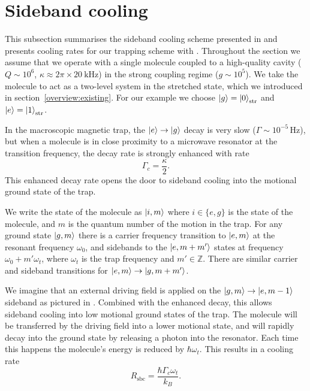 \section{Sideband cooling}

This subsection summarises the sideband cooling scheme presented in
 and presents cooling rates for our trapping scheme with
\CaF{}.  Throughout the section we assume that we operate with a single
molecule coupled to a high-quality cavity ($Q\sim10^6$, $\kappa \approx
2\pi\times \SI{20}{\kilo\hertz}$) in the strong coupling regime ($g\sim10^5$).
We take the molecule to act as a two-level system in the stretched state, which
we introduced in section~\ref{overview:existing}.  For our example we choose
$\ket{g}=\ket{0}_\text{str}$ and $\ket{e}=\ket{1}_\text{str}$.

In the macroscopic magnetic trap, the
$\ket{e}\rightarrow\ket{g}$ decay is very slow ($\Gamma \sim
10^{-5}\,\si{\hertz}$), but when a molecule is in close proximity to a microwave
resonator at the transition frequency, the decay rate is strongly enhanced
with rate
%
\begin{equation}
  \Gamma_c = \frac{\kappa}{2}.
\end{equation}
%
This enhanced decay rate opens the door to sideband cooling into the motional
ground state of the trap.

We write the state of the molecule as $\ket{i, m}$ where $i\in\{e,g\}$ is the
state of the molecule, and $m$ is the quantum number of the motion
in the trap. For any ground state $\ket{g,m}$ there is a carrier frequency
transition to $\ket{e, m}$ at the resonant frequency $\omega_0$, and sidebands
to the $\ket{e, m+m'}$ states at frequency $\omega_0 + m'\omega_t$, where
$\omega_t$ is the trap frequency and $m'\in \mathbb{Z}$. There are similar
carrier and sideband transitions for $\ket{e,m} \rightarrow \ket{g, m+m'}$.

We imagine that an external driving field is applied on the
$\ket{g, m} \rightarrow \ket{e, m-1}$ sideband as pictured in
. Combined with the enhanced decay, this allows
sideband cooling into low motional ground states of the trap. The molecule will
be transferred by the driving field into a lower motional state, and will
rapidly decay into the ground state by releasing a photon into the resonator.
Each time this happens the molecule's energy is reduced by $\hbar\omega_t$.
This results in a cooling rate
%
\begin{equation}
  R_\text{sbc} = \frac{\hbar\Gamma_c\omega_t}{k_B}.
\end{equation}


